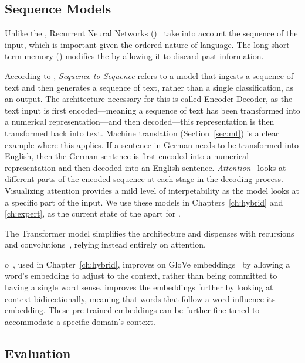 \subsection{Sequence Models}
\label{sec:seq2seq}

Unlike the \dan{}, Recurrent Neural Networks (\rnn{})~\citep{elman1990finding} take into account the sequence of the input, which is important given the ordered nature of language.  
%
The long short-term memory (\lstm{}) \citep{gers1999learning} modifies the \rnn{} by allowing it to discard past information.  

According to \citet{goldberg2017neural}, \textit{Sequence to Sequence} refers to a model that ingests a sequence of text and then generates a sequence of text, rather than a single classification, as an output.  
%
The architecture necessary for this is called Encoder-Decoder, as the text input is first encoded---meaning a sequence of text has been transformed into a numerical representation---and then decoded---this representation is then transformed back into text.  
%
Machine translation (Section~\ref{sec:mt}) is a clear example where this applies.  If a sentence in German needs to be transformed into English, then the German sentence is first encoded into a numerical representation and then decoded into an English sentence.  
%
\textit{Attention}~\citep{bahdanau2014neural} looks at different parts of the encoded sequence at each stage in the decoding process.  
%
Visualizing attention provides  a mild level of interpetability as the model looks at a specific part of the input.  
%
We use these models in Chapters~\ref{ch:hybrid} and \ref{ch:expert}, as the current state of the apart for \nlp{}.  

The Transformer model simplifies the architecture and dispenses with recursions and convolutions~\citep{vaswani2017attention}, relying instead entirely on attention.

o~\citep{Peters:2018}, used in Chapter~\ref{ch:hybrid}, improves on GloVe embeddings~\citep{pennington2014glove} by allowing a word's embedding to adjust to the context, rather than being committed to having a single word sense.  
%
 improves the embeddings further by looking at context bidirectionally, meaning that words that follow a word influence its embedding.  
%
These pre-trained embeddings can be further fine-tuned to accommodate a specific domain's context.  

\subsection{Evaluation}

